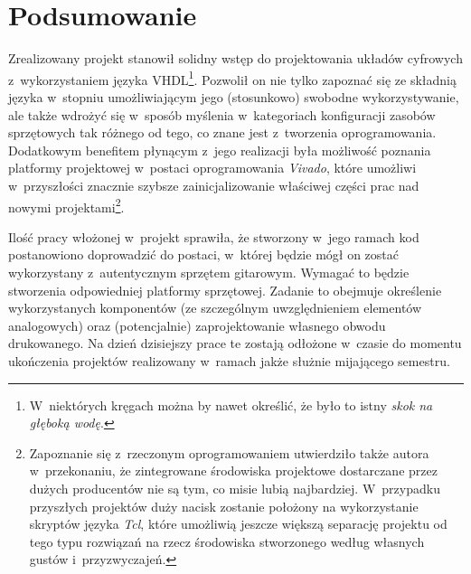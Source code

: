\section{Podsumowanie}

Zrealizowany projekt stanowił solidny wstęp do projektowania układów cyfrowych z~wykorzystaniem języka VHDL\footnote{W~niektórych kręgach można by nawet określić, że było to istny \textit{skok na głęboką wodę}.}. Pozwolił on nie tylko zapoznać się ze składnią języka w~stopniu umożliwiającym jego (stosunkowo) swobodne wykorzystywanie, ale także wdrożyć się w~sposób myślenia w~kategoriach konfiguracji zasobów sprzętowych tak różnego od tego, co znane jest z~tworzenia oprogramowania. Dodatkowym benefitem płynącym z~jego realizacji była możliwość poznania platformy projektowej w~postaci oprogramowania \textit{Vivado}, które umożliwi w~przyszłości znacznie szybsze zainicjalizowanie właściwej części prac nad nowymi projektami\footnote{Zapoznanie się z~rzeczonym oprogramowaniem utwierdziło także autora w~przekonaniu, że zintegrowane środowiska projektowe dostarczane przez dużych producentów nie są tym, co misie lubią najbardziej. W~przypadku przyszłych projektów duży nacisk zostanie położony na wykorzystanie skryptów języka \textit{Tcl}, które umożliwią jeszcze większą separację projektu od tego typu rozwiązań na rzecz środowiska stworzonego według własnych gustów i~przyzwyczajeń.}.

Ilość pracy włożonej w~projekt sprawiła, że stworzony w~jego ramach kod postanowiono doprowadzić do postaci, w~której będzie mógł on zostać wykorzystany z~autentycznym sprzętem gitarowym. Wymagać to będzie stworzenia odpowiedniej platformy sprzętowej. Zadanie to obejmuje określenie wykorzystanych komponentów (ze szczególnym uwzględnieniem elementów analogowych) oraz (potencjalnie) zaprojektowanie własnego obwodu drukowanego. Na dzień dzisiejszy prace te zostają odłożone w~czasie do momentu ukończenia projektów realizowany w~ramach jakże służnie mijającego semestru.
